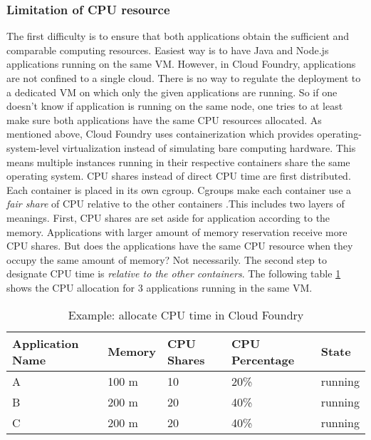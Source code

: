 \subsubsection{Limitation of CPU resource}
\label{cpu limitation}
The first difficulty is to ensure that both applications obtain the sufficient and comparable computing resources. Easiest way is to have Java and Node.js applications running on the same VM. However, in Cloud Foundry, applications are not confined to a single cloud. There is no way to regulate the deployment to a dedicated VM on which only the given applications are running. So if one doesn't know if application is running on the same node, one tries to at least make sure both applications have the same CPU resources allocated. As mentioned above, Cloud Foundry uses containerization which provides operating-system-level virtualization instead of simulating bare computing hardware. This means multiple instances running in their respective containers share the same operating system. CPU shares instead of direct CPU time are first distributed. Each container is placed in its own cgroup. Cgroups make each container use a \textit{fair share} of CPU relative to the other containers \citep{CGroup}.This includes two layers of meanings. First, CPU shares are set aside for application according to the memory. Applications with larger amount of memory reservation receive more CPU shares. But does the applications have the same CPU resource when they occupy the same amount of memory? Not necessarily. The second step to designate CPU time is \textit{relative to the other containers}. The following table \ref{CPU time in Cloud Foundry} shows the CPU allocation for 3 applications running in the same VM. 
\begin{table}[h]
	\caption{Example: allocate CPU time in Cloud Foundry}
	\label{CPU time in Cloud Foundry}
	\renewcommand{\arraystretch}{1.2}
	\centering
	\sffamily
	\begin{footnotesize}
		\begin{tabular}{l l l l l }
			\toprule
			\textbf{Application Name} & \textbf{Memory} & \textbf{CPU Shares}& \textbf{CPU Percentage} }& \textbf{State}\\
			\midrule
		    A 	&	100	m & 10 & 20\%   & running\\
			B	&	200 m & 20 & 40\% & running\\
			C	&	200 m &	20 & 40\% & running\\
			\bottomrule
		\end{tabular}
	\end{footnotesize}
	\rmfamily
\end{table}

